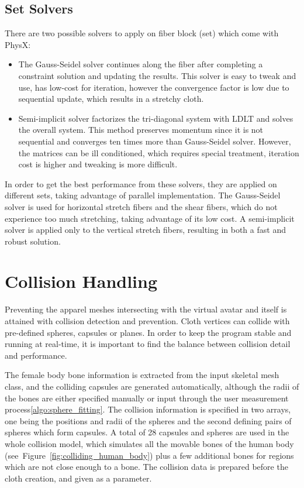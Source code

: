 \subsection{Set Solvers}
There are two possible solvers to apply on fiber block (set) which come with PhysX:
\begin{itemize}
\item The Gauss-Seidel solver continues along the fiber after completing a constraint solution and updating the results. This solver is easy to tweak and use, has low-cost for iteration, however the convergence factor is low due to sequential update, which results in a stretchy cloth.
\item Semi-implicit solver factorizes the tri-diagonal system with LDLT and solves the overall system. This method preserves momentum since it is not sequential and converges ten times more than Gauss-Seidel solver. However, the matrices can be ill conditioned, which requires special treatment, iteration cost is higher and tweaking is more difficult.
\end{itemize}

In order to get the best performance from these solvers, they are applied on different sets, taking advantage of parallel implementation. The Gauss-Seidel solver is used for horizontal stretch fibers and the shear fibers, which do not experience too much stretching, taking advantage of its low cost. A semi-implicit solver is applied only to the vertical stretch fibers, resulting in both a fast and robust solution.

\section{Collision Handling}
\label{section_chapter_collision}

Preventing the apparel meshes intersecting with the virtual avatar and itself is attained with collision detection and prevention. Cloth vertices can collide with pre-defined spheres, capsules or planes. In order to keep the program stable and running at real-time, it is important to find the balance between collision detail and performance. 

The female body bone information is extracted from the input skeletal mesh class, and the colliding capsules are generated automatically, although the radii of the bones are either specified manually or input through the user measurement process\ref{algo:sphere_fitting}. The collision information is specified in two arrays, one being the positions and radii of the spheres and the second defining pairs of spheres which form capsules. A total of 28 capsules and spheres are used in the whole collision model, which simulates all the movable bones of the human body (see~Figure~\ref{fig:colliding_human_body}) plus a few additional bones for regions which are not close enough to a bone.  The collision data is prepared before the cloth creation, and given as a parameter. 

